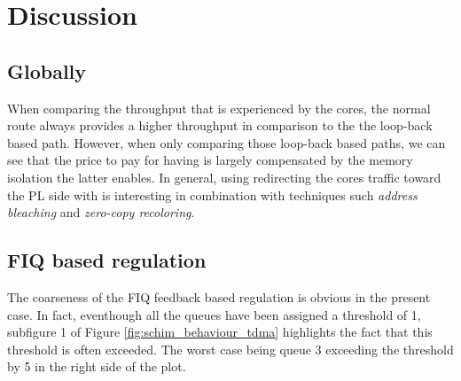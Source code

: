 \section{Discussion}
    \subsection{Globally}
      When comparing the throughput that is experienced by the cores, the normal route always provides a higher throughput in comparison to the the loop-back based path.
      However, when only comparing those loop-back based paths, we can see that the price to pay for having \schim is largely compensated by the memory isolation the latter enables.
    In general, using redirecting the cores traffic toward the PL side with \schim is interesting in combination with techniques such \textit{address bleaching} and \textit{zero-copy recoloring}.
    
    \subsection{FIQ based regulation}
      The coarseness of the FIQ feedback based regulation is obvious in the present case. In fact, eventhough all the queues have been assigned a threshold of 1, subfigure 1 of Figure \ref{fig:schim_behaviour_tdma} highlights the fact that this threshold is often exceeded. The worst case being queue 3 exceeding the threshold by 5 in the right side of the plot.
